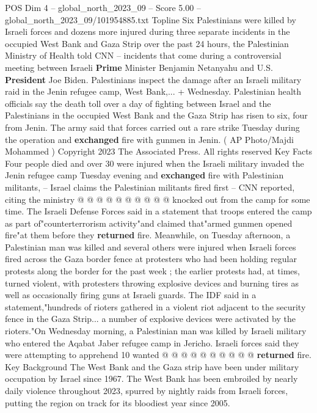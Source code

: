 \begin{textsample}{POS Dim 4 – global\_north\_2023\_09 – Score 5.00 – global\_north\_2023\_09/101954885.txt}  \label{ex:f4_pos_418}
Topline Six Palestinians were killed by Israeli forces and dozens more injured during three separate incidents in the occupied West Bank and Gaza Strip over the past 24 hours, the Palestinian Ministry of Health told CNN -- incidents that come during a controversial meeting between Israeli \textbf{Prime} Minister Benjamin Netanyahu and U.S. \textbf{President} Joe Biden.
Palestinians inspect the damage after an Israeli military raid in the Jenin refugee camp, West Bank,... + Wednesday.
Palestinian health officials say the death toll over a day of fighting between Israel and the Palestinians in the occupied West Bank and the Gaza Strip has risen to six, four from Jenin.
The army said that forces carried out a rare strike Tuesday during the operation and \textbf{exchanged} fire with gunmen in Jenin. ( AP Photo/Majdi Mohammed ) Copyright 2023 The Associated Press.
All rights reserved Key Facts Four people died and over 30 were injured when the Israeli military invaded the Jenin refugee camp Tuesday evening and \textbf{exchanged} fire with Palestinian militants, -- Israel claims the Palestinian militants fired first -- CNN reported, citing the ministry @ @ @ @ @ @ @ @ @ @ knocked out from the camp for some time.
The Israeli Defense Forces said in a statement that troops entered the camp as part of"counterterrorism activity"and claimed that"armed gunmen opened fire"at them before they \textbf{returned} fire.
Meanwhile, on Tuesday afternoon, a Palestinian man was killed and several others were injured when Israeli forces fired across the Gaza border fence at protesters who had been holding regular protests along the border for the past week ; the earlier protests had, at times, turned violent, with protesters throwing explosive devices and burning tires as well as occasionally firing guns at Israeli guards.
The IDF said in a statement,"hundreds of rioters gathered in a violent riot adjacent to the security fence in the Gaza Strip... a number of explosive devices were activated by the rioters."On Wednesday morning, a Palestinian man was killed by Israeli military who entered the Aqabat Jaber refugee camp in Jericho.
Israeli forces said they were attempting to apprehend 10 wanted @ @ @ @ @ @ @ @ @ @ \textbf{returned} fire.
Key Background The West Bank and the Gaza strip have been under military occupation by Israel since 1967.
The West Bank has been embroiled by nearly daily violence throughout 2023, spurred by nightly raids from Israeli forces, putting the region on track for its bloodiest year since 2005.

\end{textsample}
